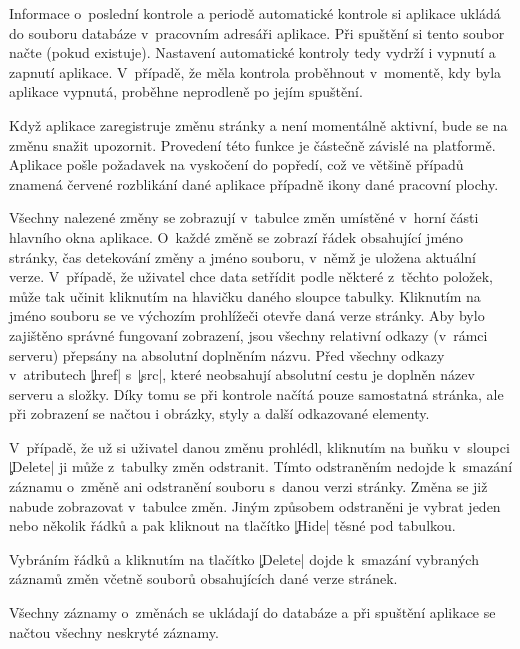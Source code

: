 Informace o~poslední kontrole a periodě automatické kontrole si aplikace ukládá do souboru databáze v~pracovním adresáři aplikace.
Při spuštění si tento soubor načte (pokud existuje).
Nastavení automatické kontroly tedy vydrží i vypnutí a zapnutí aplikace.
V~případě, že měla kontrola proběhnout v~momentě, kdy byla aplikace vypnutá, proběhne neprodleně po jejím spuštění.

Když aplikace zaregistruje změnu stránky a není momentálně aktivní, bude se na změnu snažit upozornit.
Provedení této funkce je částečně závislé na platformě. 
Aplikace pošle požadavek na vyskočení do popředí, což ve většině případů znamená červené rozblikání dané aplikace případně ikony dané pracovní plochy.

Všechny nalezené změny se zobrazují v~tabulce změn umístěné v~horní části hlavního okna aplikace.
O~každé změně se zobrazí řádek obsahující jméno stránky, čas detekování změny a jméno souboru, v~němž je uložena aktuální verze.
V~případě, že uživatel chce data setřídit podle některé z~těchto položek, může tak učinit kliknutím na hlavičku daného sloupce tabulky.
Kliknutím na jméno souboru se ve výchozím prohlížeči otevře daná verze stránky.
Aby bylo zajištěno správné fungovaní zobrazení, jsou všechny relativní odkazy (v~rámci serveru) přepsány na absolutní doplněním názvu.
Před všechny odkazy v~atributech \c|href| s~\c|src|, které neobsahují absolutní cestu je doplněn název serveru a složky.
Díky tomu se při kontrole načítá pouze samostatná stránka, ale při zobrazení se načtou i obrázky, styly a další odkazované elementy.

V~případě, že už si uživatel danou změnu prohlédl, kliknutím na buňku v~sloupci \c|Delete| ji může z~tabulky změn odstranit.
Tímto odstraněním nedojde k~smazání záznamu o~změně ani odstranění souboru s~danou verzi stránky.
Změna se již nabude zobrazovat v~tabulce změn.
Jiným způsobem odstraněni je vybrat jeden nebo několik řádků a pak kliknout na tlačítko \c|Hide| těsné pod tabulkou.

Vybráním řádků a kliknutím na tlačítko \c|Delete| dojde k~smazání vybraných záznamů změn včetně souborů obsahujících dané verze stránek.

Všechny záznamy o~změnách se ukládají do databáze a při spuštění aplikace se načtou všechny neskryté záznamy. 
